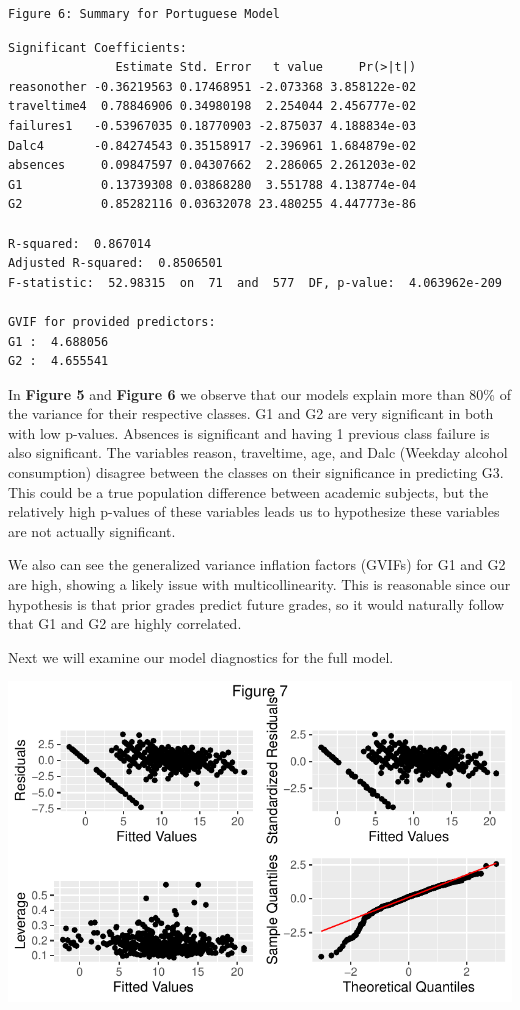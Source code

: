 \documentclass[
  letterpaper,
  DIV=11,
  numbers=noendperiod]{scrartcl}
\begin{document}
\begin{verbatim}
Figure 6: Summary for Portuguese Model 
\end{verbatim}

\begin{verbatim}
Significant Coefficients:
               Estimate Std. Error   t value     Pr(>|t|)
reasonother -0.36219563 0.17468951 -2.073368 3.858122e-02
traveltime4  0.78846906 0.34980198  2.254044 2.456777e-02
failures1   -0.53967035 0.18770903 -2.875037 4.188834e-03
Dalc4       -0.84274543 0.35158917 -2.396961 1.684879e-02
absences     0.09847597 0.04307662  2.286065 2.261203e-02
G1           0.13739308 0.03868280  3.551788 4.138774e-04
G2           0.85282116 0.03632078 23.480255 4.447773e-86

R-squared:  0.867014 
Adjusted R-squared:  0.8506501 
F-statistic:  52.98315  on  71  and  577  DF, p-value:  4.063962e-209 

GVIF for provided predictors:
G1 :  4.688056 
G2 :  4.655541 
\end{verbatim}

In \textbf{Figure 5} and \textbf{Figure 6} we observe that our models
explain more than 80\% of the variance for their respective classes. G1
and G2 are very significant in both with low p-values. Absences is
significant and having 1 previous class failure is also significant. The
variables reason, traveltime, age, and Dalc (Weekday alcohol
consumption) disagree between the classes on their significance in
predicting G3. This could be a true population difference between
academic subjects, but the relatively high p-values of these variables
leads us to hypothesize these variables are not actually significant.

We also can see the generalized variance inflation factors (GVIFs) for
G1 and G2 are high, showing a likely issue with multicollinearity. This
is reasonable since our hypothesis is that prior grades predict future
grades, so it would naturally follow that G1 and G2 are highly
correlated.

Next we will examine our model diagnostics for the full model.

\includegraphics{Final_Paper_edit_files/figure-pdf/unnamed-chunk-7-1.pdf}
\end{document}
